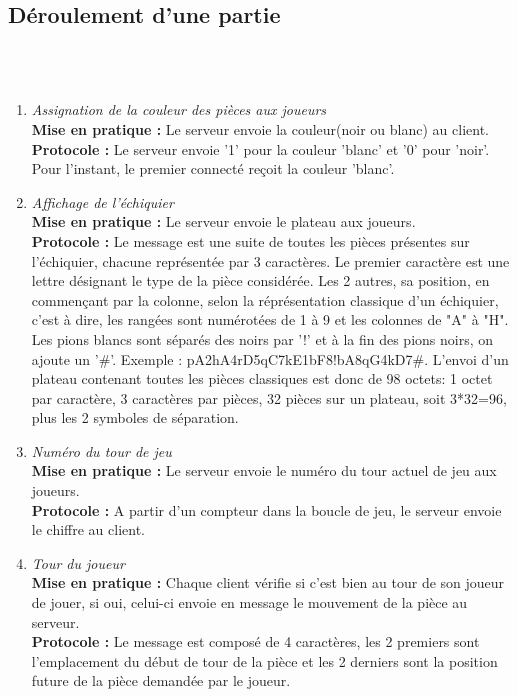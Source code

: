 \documentclass[10pt, a4paper]{article}
\begin{document}
\subsection{Déroulement d'une partie  } \\ \\

\begin{enumerate}

\item \textit{Assignation de la couleur des pièces aux joueurs} \\
\textbf{Mise en pratique :} Le serveur envoie la couleur(noir ou blanc) au client. \\
\textbf{Protocole :} Le serveur envoie '1' pour la couleur 'blanc' et '0' pour 'noir'. Pour l'instant, le premier connecté reçoit la couleur 'blanc'.  

\item \textit{Affichage de l'échiquier} \\
\textbf{Mise en pratique :} Le serveur envoie le plateau aux joueurs. \\
\textbf{Protocole :} Le message est une suite de toutes les pièces présentes sur l'échiquier, chacune représentée par 3 caractères. Le premier caractère est une lettre désignant le type de la pièce considérée. Les 2 autres, sa position, en commençant par la colonne, selon la réprésentation classique d'un échiquier, c'est à dire, les rangées sont numérotées de 1 à 9 et les colonnes de "A" à "H". Les pions blancs sont séparés des noirs par '!' et à la fin des pions noirs, on ajoute un '#'. Exemple : pA2hA4rD5qC7kE1bF8!bA8qG4kD7#. L'envoi d'un plateau contenant toutes les pièces classiques est donc de 98 octets: 1 octet par caractère, 3 caractères par pièces, 32 pièces sur un plateau, soit 3*32=96, plus les 2 symboles de séparation.   

\item \textit{Numéro du tour de jeu} \\
\textbf{Mise en pratique :} Le serveur envoie le numéro du tour actuel de jeu aux joueurs.  \\
\textbf{Protocole :} A partir d'un compteur dans la boucle de jeu, le serveur envoie le chiffre au client.  

\item \textit{Tour du joueur} \\
\textbf{Mise en pratique :} Chaque client vérifie si c'est bien au tour de son joueur de jouer, si oui, celui-ci envoie en message le mouvement de la pièce au serveur. \\
\textbf{Protocole :} Le message est composé de 4 caractères, les 2 premiers sont l'emplacement du début de tour de la pièce et les 2 derniers sont la position future de la pièce demandée par le joueur.


\end{enumerate}
\end{document}
